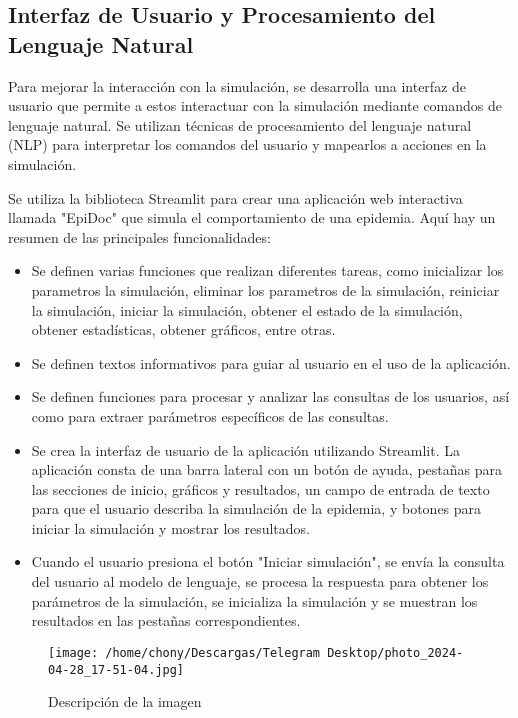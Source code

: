 \subsection{Interfaz de Usuario y Procesamiento del Lenguaje Natural}
Para mejorar la interacción con la simulación, se desarrolla una interfaz de usuario que permite a estos interactuar con la simulación mediante comandos de lenguaje natural. Se utilizan técnicas de procesamiento del lenguaje natural (NLP) para interpretar los comandos del usuario y mapearlos a acciones en la simulación.

Se utiliza la biblioteca Streamlit para crear una aplicación web interactiva llamada "EpiDoc" que simula el comportamiento de una epidemia. Aquí hay un resumen de las principales funcionalidades:
\begin{itemize}
    \item Se definen varias funciones que realizan diferentes tareas, como inicializar los parametros la simulación, eliminar los parametros de la simulación, reiniciar la simulación, iniciar la simulación, obtener el estado de la simulación, obtener estadísticas, obtener gráficos, entre otras.
    \item Se definen textos informativos para guiar al usuario en el uso de la aplicación.
    \item Se definen funciones para procesar y analizar las consultas de los usuarios, así como para extraer parámetros específicos de las consultas.
    \item Se crea la interfaz de usuario de la aplicación utilizando Streamlit. La aplicación consta de una barra lateral con un botón de ayuda, pestañas para las secciones de inicio, gráficos y resultados, un campo de entrada de texto para que el usuario describa la simulación de la epidemia, y botones para iniciar la simulación y mostrar los resultados.
    \item Cuando el usuario presiona el botón "Iniciar simulación", se envía la consulta del usuario al modelo de lenguaje, se procesa la respuesta para obtener los parámetros de la simulación, se inicializa la simulación y se muestran los resultados en las pestañas correspondientes.
\end{itemize}

\begin{figure}[H]
    \centering
    \texttt{[image: /home/chony/Descargas/Telegram Desktop/photo\_2024-04-28\_17-51-04.jpg]}
    \caption{Descripción de la imagen}
\end{figure}

